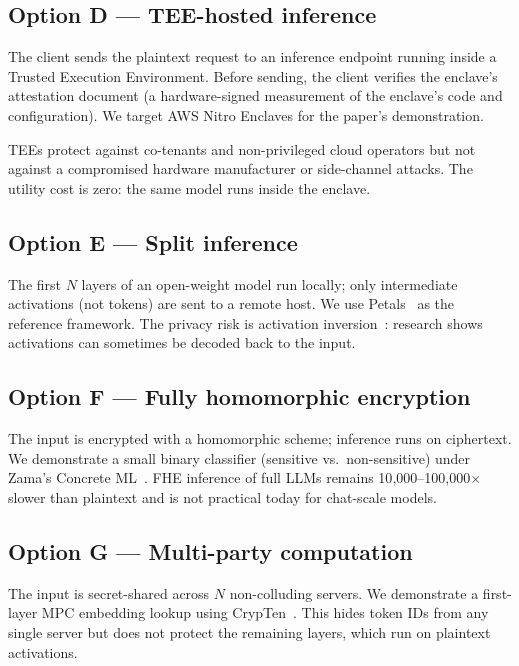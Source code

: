 \documentclass[11pt,a4paper]{article}
\begin{document}
\subsection{Option D --- TEE-hosted inference}

The client sends the plaintext request to an inference endpoint
running inside a Trusted Execution Environment.  Before sending,
the client verifies the enclave's attestation document (a
hardware-signed measurement of the enclave's code and
configuration).  We target AWS Nitro Enclaves for the paper's
demonstration.

TEEs protect against co-tenants and non-privileged cloud operators
but not against a compromised hardware manufacturer or
side-channel attacks.  The utility cost is zero: the same model
runs inside the enclave.

\subsection{Option E --- Split inference}

The first $N$ layers of an open-weight model run locally; only
intermediate activations (not tokens) are sent to a remote host.
We use Petals~\cite{petals} as the reference framework.
The privacy risk is activation
inversion~\cite{activation-inversion}: research shows activations
can sometimes be decoded back to the input.

\subsection{Option F --- Fully homomorphic encryption}

The input is encrypted with a homomorphic scheme; inference runs
on ciphertext.  We demonstrate a small binary classifier
(sensitive vs.\ non-sensitive) under Zama's Concrete
ML~\cite{zama}.  FHE
inference of full LLMs remains 10{,}000--100{,}000$\times$ slower
than plaintext and is not practical today for chat-scale models.

\subsection{Option G --- Multi-party computation}

The input is secret-shared across $N$ non-colluding servers.
We demonstrate a first-layer MPC embedding lookup using
CrypTen~\cite{crypten}.  This hides token IDs from any
single server but does not protect
the remaining layers, which run on plaintext activations.
\end{document}
